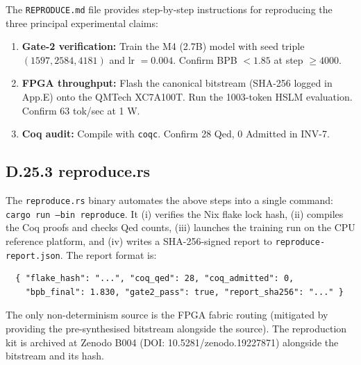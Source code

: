 The \texttt{REPRODUCE.md} file provides step-by-step instructions for reproducing the three principal experimental claims:

\begin{enumerate}
\item \textbf{Gate-2 verification:} Train the M4 (2.7B) model with seed triple \((1597, 2584, 4181)\) and lr \(= 0.004\). Confirm BPB \(< 1.85\) at step \(\geq 4000\).
\item \textbf{FPGA throughput:} Flash the canonical bitstream (SHA-256 logged in App.E) onto the QMTech XC7A100T. Run the 1003-token HSLM evaluation. Confirm 63 tok/sec at 1 W.
\item \textbf{Coq audit:} Compile  with \texttt{coqc}. Confirm 28 Qed, 0 Admitted in INV-7.
\end{enumerate}

\subsection*{D.25.3  reproduce.rs}

The \texttt{reproduce.rs} binary automates the above steps into a single command: \texttt{cargo run --bin reproduce}. It (i) verifies the Nix flake lock hash, (ii) compiles the Coq proofs and checks Qed counts, (iii) launches the training run on the CPU reference platform, and (iv) writes a SHA-256-signed report to \texttt{reproduce-report.json}. The report format is:

\begin{verbatim}
  { "flake_hash": "...", "coq_qed": 28, "coq_admitted": 0,
    "bpb_final": 1.830, "gate2_pass": true, "report_sha256": "..." }
\end{verbatim}

The only non-determinism source is the FPGA fabric routing (mitigated by providing the pre-synthesised bitstream alongside the source). The reproduction kit is archived at Zenodo B004 (DOI: 10.5281/zenodo.19227871) alongside the bitstream and its hash.
